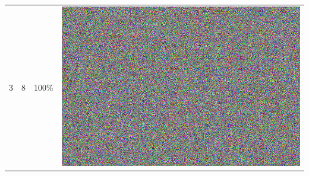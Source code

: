 \documentclass[times, utf8, seminar, numeric]{fer}
\begin{document}
\begin{center}
\begin{longtable}{|c|c|c|c|}
3 & 8 &100\% & \includegraphics[scale=0.3]{../benchmark_results/color_chart/3_components-8_bits.png} \\
\end{longtable}
\end{center}
\end{document}
